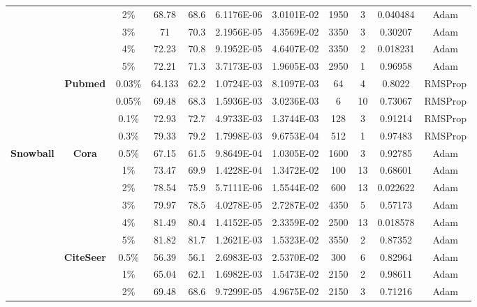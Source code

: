 \documentclass{article}
\begin{document}
\begin{table}[htbp]
\begin{tabular}{ccccc|cccccc}
          &       & 2\%   & 68.78 & 68.6  & 6.1176E-06 & 3.0101E-02 & 1950  & 3     & 0.040484 & Adam \\
          &       & 3\%   & 71    & 70.3  & 2.1956E-05 & 4.3569E-02 & 3350  & 3     & 0.30207 & Adam \\
          &       & 4\%   & 72.23 & 70.8  & 9.1952E-05 & 4.6407E-02 & 3350  & 2     & 0.018231 & Adam \\
          &       & 5\%   & 72.21 & 71.3  & 3.7173E-03 & 1.9605E-03 & 2950  & 1     & 0.96958 & Adam \\
          & \multirow{4}[1]{*}{\textbf{Pubmed}} & 0.03\% & 64.133 & 62.2  & 1.0724E-03 & 8.1097E-03 & 64    & 4     & 0.8022 & RMSProp \\
          &       & 0.05\% & 69.48 & 68.3  & 1.5936E-03 & 3.0236E-03 & 6     & 10    & 0.73067 & RMSProp \\
          &       & 0.1\% & 72.93 & 72.7  & 4.9733E-03 & 1.3744E-03 & 128   & 3     & 0.91214 & RMSProp \\
          &       & 0.3\% & 79.33 & 79.2  & 1.7998E-03 & 9.6753E-04 & 512   & 1     & 0.97483 & RMSProp \\
    \midrule
    \multirow{16}[2]{*}{\textbf{Snowball}} & \multirow{6}[1]{*}{\textbf{Cora}} & 0.5\% & 67.15 & 61.5  & 9.8649E-04 & 1.0305E-02 & 1600  & 3     & 0.92785 & Adam \\
          &       & 1\%   & 73.47 & 69.9  & 1.4228E-04 & 1.3472E-02 & 100   & 13    & 0.68601 & Adam \\
          &       & 2\%   & 78.54 & 75.9  & 5.7111E-06 & 1.5544E-02 & 600   & 13    & 0.022622 & Adam \\
          &       & 3\%   & 79.97 & 78.5  & 4.0278E-05 & 2.7287E-02 & 4350  & 5     & 0.57173 & Adam \\
          &       & 4\%   & 81.49 & 80.4  & 1.4152E-05 & 2.3359E-02 & 2500  & 13    & 0.018578 & Adam \\
          &       & 5\%   & 81.82 & 81.7  & 1.2621E-03 & 1.5323E-02 & 3550  & 2     & 0.87352 & Adam \\
          & \multirow{6}[0]{*}{\textbf{CiteSeer}} & 0.5\% & 56.39 & 56.1  & 2.6983E-03 & 2.5370E-02 & 300   & 6     & 0.82964 & Adam \\
          &       & 1\%   & 65.04 & 62.1  & 1.6982E-03 & 1.5473E-02 & 2150  & 2     & 0.98611 & Adam \\
          &       & 2\%   & 69.48 & 68.6  & 9.7299E-05 & 4.9675E-02 & 2150  & 3     & 0.71216 & Adam \\

\end{tabular}
\end{table}
\end{document}

